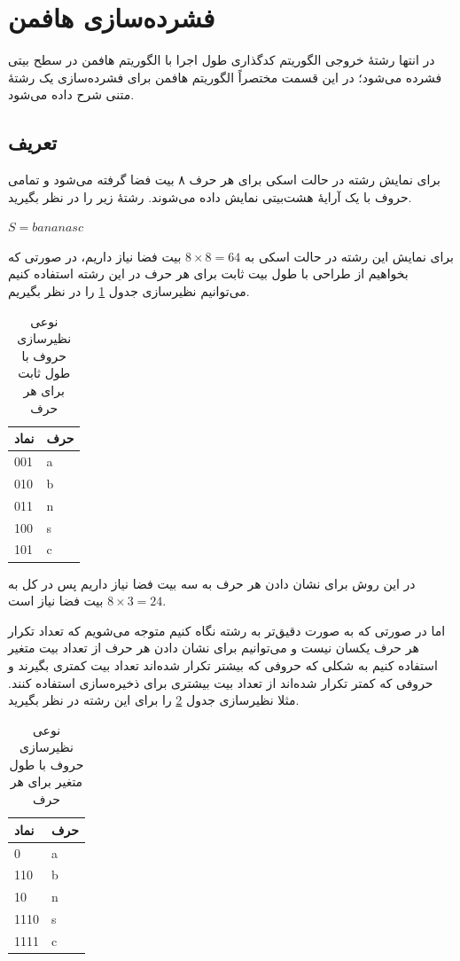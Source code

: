 \section{فشرده‌سازی هافمن }
در انتها رشتهٔ خروجی الگوریتم کدگذاری طول اجرا با الگوریتم هافمن در سطح بیتی فشرده‌ می‌شود؛
در این قسمت مختصراً الگوریتم هافمن برای فشرده‌سازی یک رشتهٔ متنی شرح داده می‌شود.

\subsection{تعریف}
برای نمایش رشته در حالت 
اسکی
برای هر حرف ۸ بیت فضا گرفته می‌شود و تمامی حروف با یک آرایهٔ هشت‌بیتی
نمایش داده می‌شوند. رشتهٔ زیر را در نظر بگیرید.
\begin{center}
        $S = bananasc$
\end{center}

برای نمایش این رشته در حالت اسکی به 
$ 8 \times 8 = 64$ 
بیت فضا نیاز داریم، در صورتی که بخواهیم از طراحی 
با طول بیت ثابت برای هر حرف در این رشته استفاده کنیم می‌توانیم نظیرسازی 
جدول
\ref{huffman_fixed}
 را در نظر بگیریم. 

\begin{table}[H]
        \centering
        \caption{نوعی نظیرسازی حروف با طول ثابت برای هر حرف}
        \label{huffman_fixed}
        \begin{tabular}{ll}
        \hline
        نماد & حرف \\ \hline
        001 & a \\
        010 & b \\
        011 & n \\
        100 & s \\
        101 & c \\ \hline
        \end{tabular}
\end{table}

در این روش برای نشان دادن هر حرف به سه بیت فضا نیاز داریم پس در کل به
$ 8 \times 3 = 24 $
بیت فضا نیاز است. 

اما در صورتی که به صورت دقیق‌تر به رشته نگاه کنیم متوجه می‌شویم که تعداد تکرار هر حرف
یکسان نیست و می‌توانیم برای نشان دادن هر حرف از تعداد بیت متغیر استفاده کنیم به شکلی که 
حروفی که بیشتر تکرار شده‌اند تعداد بیت کمتری بگیرند و حروفی که کمتر تکرار
شده‌اند از تعداد بیت بیشتری برای ذخیره‌‌سازی استفاده کنند. مثلا نظیرسازی جدول
\ref{huffman} 
را برای این رشته در نظر بگیرید.

\begin{table}[H]
        \centering
        \caption{نوعی نظیرسازی حروف با طول متغیر برای هر حرف}
        \label{huffman}
        \begin{tabular}{ll}
        \hline
        نماد & حرف \\ \hline
        0 & a \\
        110 & b \\
        10 & n \\
        1110 & s \\
        1111 & c \\ \hline
        \end{tabular}
\end{table}

